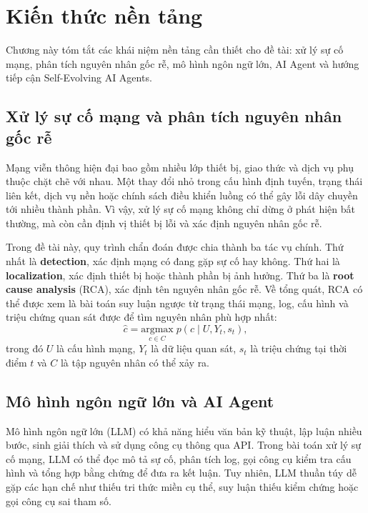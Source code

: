 \chapter{Kiến thức nền tảng}
\label{chap:related_work}

Chương này tóm tắt các khái niệm nền tảng cần thiết cho đề tài: xử lý sự cố mạng, phân tích nguyên nhân gốc rễ, mô hình ngôn ngữ lớn, AI Agent và hướng tiếp cận Self-Evolving AI Agents.

\section{Xử lý sự cố mạng và phân tích nguyên nhân gốc rễ}
\label{sec:network_troubleshooting_rca}

Mạng viễn thông hiện đại bao gồm nhiều lớp thiết bị, giao thức và dịch vụ phụ thuộc chặt chẽ với nhau. Một thay đổi nhỏ trong cấu hình định tuyến, trạng thái liên kết, dịch vụ nền hoặc chính sách điều khiển luồng có thể gây lỗi dây chuyền tới nhiều thành phần. Vì vậy, xử lý sự cố mạng không chỉ dừng ở phát hiện bất thường, mà còn cần định vị thiết bị lỗi và xác định nguyên nhân gốc rễ.

Trong đề tài này, quy trình chẩn đoán được chia thành ba tác vụ chính. Thứ nhất là \textbf{detection}, xác định mạng có đang gặp sự cố hay không. Thứ hai là \textbf{localization}, xác định thiết bị hoặc thành phần bị ảnh hưởng. Thứ ba là \textbf{root cause analysis} (RCA), xác định tên nguyên nhân gốc rễ. Về tổng quát, RCA có thể được xem là bài toán suy luận ngược từ trạng thái mạng, log, cấu hình và triệu chứng quan sát được để tìm nguyên nhân phù hợp nhất:
\begin{equation}
\hat{c} = \underset{c \in C}{\mathrm{argmax}}\; p(c \mid U, Y_t, s_t),
\end{equation}
trong đó $U$ là cấu hình mạng, $Y_t$ là dữ liệu quan sát, $s_t$ là triệu chứng tại thời điểm $t$ và $C$ là tập nguyên nhân có thể xảy ra.

\section{Mô hình ngôn ngữ lớn và AI Agent}
\label{sec:llm_agent}

Mô hình ngôn ngữ lớn (LLM) có khả năng hiểu văn bản kỹ thuật, lập luận nhiều bước, sinh giải thích và sử dụng công cụ thông qua API. Trong bài toán xử lý sự cố mạng, LLM có thể đọc mô tả sự cố, phân tích log, gọi công cụ kiểm tra cấu hình và tổng hợp bằng chứng để đưa ra kết luận. Tuy nhiên, LLM thuần túy dễ gặp các hạn chế như thiếu tri thức miền cụ thể, suy luận thiếu kiểm chứng hoặc gọi công cụ sai tham số.

